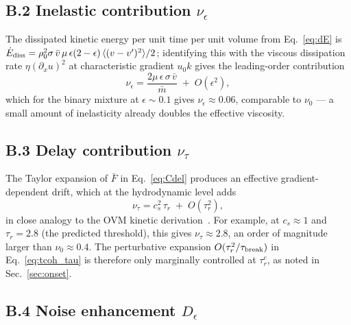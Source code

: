 \documentclass[aps,pre,twocolumn,superscriptaddress,longbibliography,floatfix]{revtex4-2}
\begin{document}
\subsection*{B.2 Inelastic contribution $\nu_\epsilon$}

The dissipated kinetic energy per unit time per unit volume
from Eq.~\eqref{eq:dE} is $\dot E_{\rm diss} = \rho_0^2
\sigma\,\bar v\,\mu\,\epsilon(2-\epsilon)\,\langle(v-v')^2\rangle/2$;
identifying this with the viscous dissipation rate
$\eta(\partial_x u)^2$ at characteristic gradient $u_0 k$
gives the leading-order contribution
\begin{equation}
\nu_\epsilon = \frac{2 \mu\,\epsilon\,\sigma\,\bar v}{\bar m}
\;+\; O(\epsilon^2),
\label{eq:nu_eps}
\end{equation}
which for the binary mixture at $\epsilon\sim 0.1$ gives
$\nu_\epsilon \approx 0.06$, comparable to $\nu_0$ — a small
amount of inelasticity already doubles the effective
viscosity.

\subsection*{B.3 Delay contribution $\nu_\tau$}

The Taylor expansion of $\bar F$ in Eq.~\eqref{eq:Cdel}
produces an effective gradient-dependent drift, which at the
hydrodynamic level adds
\begin{equation}
\nu_\tau = c_s^2\,\tau_r\;+\;O(\tau_r^2),
\label{eq:nu_tau}
\end{equation}
in close analogy to the OVM kinetic
derivation~\cite{Komatsu1995}. For example, at $c_s\approx 1$
and $\tau_r=2.8$ (the predicted threshold), this gives
$\nu_\tau\approx 2.8$, an order of magnitude larger than
$\nu_0\approx 0.4$. The perturbative expansion
$O(\tau_r^2/\tau_{\rm break})$ in Eq.~\eqref{eq:tcoh_tau}
is therefore only marginally controlled at $\tau_r^c$, as
noted in Sec.~\ref{sec:onset}.

\subsection*{B.4 Noise enhancement $D_\epsilon$}
\end{document}
